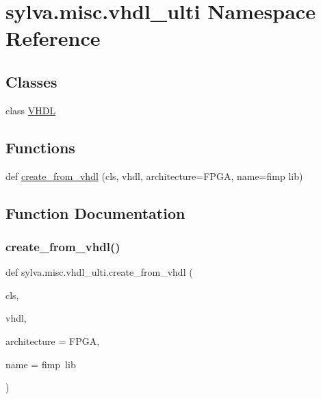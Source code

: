 \hypertarget{namespacesylva_1_1misc_1_1vhdl__ulti}{}\section{sylva.\+misc.\+vhdl\+\_\+ulti Namespace Reference}
\label{namespacesylva_1_1misc_1_1vhdl__ulti}
\subsection*{Classes}
\begin{DoxyCompactItemize}
\item 
class \hyperlink{classsylva_1_1misc_1_1vhdl__ulti_1_1_v_h_d_l}{V\+H\+DL}
\end{DoxyCompactItemize}
\subsection*{Functions}
\begin{DoxyCompactItemize}
\item 
def \hyperlink{namespacesylva_1_1misc_1_1vhdl__ulti_aeb869044a3abdaed35a68feec0f779fa}{create\+\_\+from\+\_\+vhdl} (cls, vhdl, architecture=\textquotesingle{}F\+P\+GA\textquotesingle{}, name=\textquotesingle{}fimp lib\textquotesingle{})
\end{DoxyCompactItemize}


\subsection{Function Documentation}
\mbox{\label{namespacesylva_1_1misc_1_1vhdl__ulti_aeb869044a3abdaed35a68feec0f779fa}} 
\subsubsection{\texorpdfstring{create\+\_\+from\+\_\+vhdl()}{create\_from\_vhdl()}}
{\footnotesize\ttfamily def sylva.\+misc.\+vhdl\+\_\+ulti.\+create\+\_\+from\+\_\+vhdl (\begin{DoxyParamCaption}\item[{}]{cls,  }\item[{}]{vhdl,  }\item[{}]{architecture = {\ttfamily \textquotesingle{}FPGA\textquotesingle{}},  }\item[{}]{name = {\ttfamily \textquotesingle{}fimp~lib\textquotesingle{}} }\end{DoxyParamCaption})}



